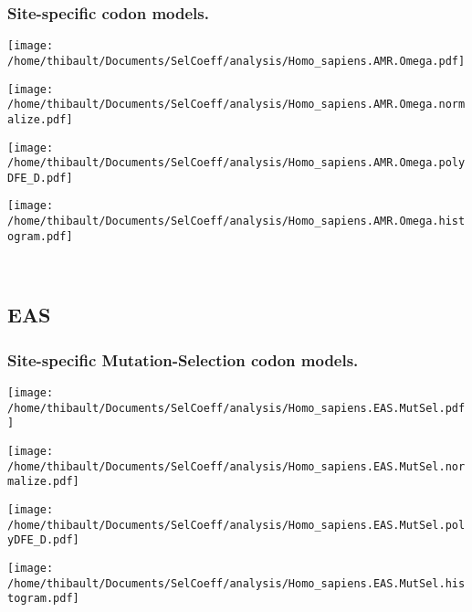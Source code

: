 \subsubsection*{Site-specific codon models.} 
\begin{minipage}{0.49\linewidth} 
\texttt{[image: /home/thibault/Documents/SelCoeff/analysis/Homo\_sapiens.AMR.Omega.pdf]} 
\end{minipage}
\begin{minipage}{0.49\linewidth} 
\texttt{[image: /home/thibault/Documents/SelCoeff/analysis/Homo\_sapiens.AMR.Omega.normalize.pdf]} 
\end{minipage}
\begin{minipage}{0.49\linewidth} 
\texttt{[image: /home/thibault/Documents/SelCoeff/analysis/Homo\_sapiens.AMR.Omega.polyDFE\_D.pdf]} 
\end{minipage}
\begin{minipage}{0.49\linewidth} 
\texttt{[image: /home/thibault/Documents/SelCoeff/analysis/Homo\_sapiens.AMR.Omega.histogram.pdf]} 
\end{minipage}
\\ 
\subsection{EAS} 
 
\subsubsection*{Site-specific Mutation-Selection codon models.} 
\begin{minipage}{0.49\linewidth} 
\texttt{[image: /home/thibault/Documents/SelCoeff/analysis/Homo\_sapiens.EAS.MutSel.pdf]} 
\end{minipage}
\begin{minipage}{0.49\linewidth} 
\texttt{[image: /home/thibault/Documents/SelCoeff/analysis/Homo\_sapiens.EAS.MutSel.normalize.pdf]} 
\end{minipage}
\begin{minipage}{0.49\linewidth} 
\texttt{[image: /home/thibault/Documents/SelCoeff/analysis/Homo\_sapiens.EAS.MutSel.polyDFE\_D.pdf]} 
\end{minipage}
\begin{minipage}{0.49\linewidth} 
\texttt{[image: /home/thibault/Documents/SelCoeff/analysis/Homo\_sapiens.EAS.MutSel.histogram.pdf]} 
\end{minipage}
\\ 
